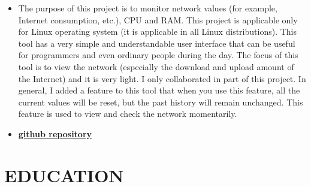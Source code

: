 \documentclass[11pt,a4paper,roman]{moderncv}
\begin{document}
{
{\begin{itemize}
  \item  The purpose of this project is to monitor network values (for example, Internet consumption, etc.), CPU and RAM.
  This project is applicable only for Linux operating system (it is applicable in all Linux distributions).
  This tool has a very simple and understandable user interface that can be useful for programmers and even ordinary people during the day.
  The focus of this tool is to view the network (especially the download and upload amount of the Internet) and it is very light.
  I only collaborated in part of this project. In general, I added a feature to this tool that when you use this feature, all the current values will be reset, but the past history will remain unchanged. This feature is used to view and check the network momentarily.
\item \href{https://github.com/ashtum/gambal}{\textbf{github repository}}
\end{itemize}
}
}



\section{EDUCATION}



\end{document}
